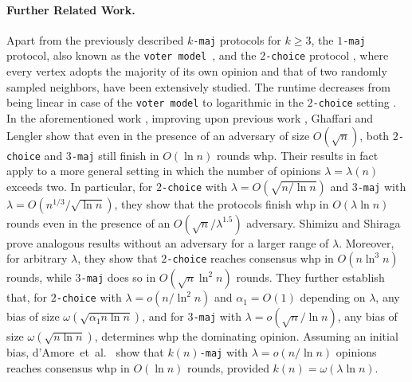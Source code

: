 \documentclass[11pt]{article}
\numberwithin{theorem}{section}
\begin{document}
\paragraph{Further Related Work.} Apart from the previously described \texttt{$k$-maj} protocols for $k\geq 3$, the \texttt{$1$-maj} protocol, also known as the \texttt{voter model}~\cite{cooperetal,HASSIN2001248,kanade,nakata}, and the \texttt{$2$-choice} protocol \cite{cooper_et_al:LIPIcs.DISC.2017.13,crucianietal,cruciani:hal-02002462,twochoicestabconsensus}, where every vertex adopts the majority of its own opinion and that of two randomly sampled neighbors, have been extensively studied.
The runtime decreases from being linear in case of the \texttt{voter model} \cite{berenbrink2016boundsvotermodeldynamic} to logarithmic in the \texttt{$2$-choice} setting \cite{GhaffariLengler}. 
In the aforementioned work \cite{GhaffariLengler}, improving upon previous work \cite{becchettilowerbound,hierarchyconj,ElsasserFKMT16,elsaesseretal}, Ghaffari and Lengler show that even in the presence of an adversary of size $O(\sqrt{n})$, both \texttt{$2$-choice} and \texttt{$3$-maj} still finish in $O(\ln n)$ rounds whp. Their results in fact apply to a more general setting in which the number of opinions $\lambda=\lambda(n)$ exceeds two. In particular,
for \texttt{$2$-choice} with $\lambda=O(\sqrt{n/\ln n})$ and \texttt{$3$-maj} with $\lambda =O(n^{1/3}/\sqrt{\ln n})$, they show that the protocols finish whp in $O(\lambda\ln n)$ rounds even in the presence of an $O(\sqrt{n}/\lambda^{1.5})$ adversary. 
Shimizu and Shiraga \cite{shimizu25} prove analogous results without an adversary for a larger range of $\lambda$. Moreover, for arbitrary $\lambda$, they show that \texttt{$2$-choice} reaches consensus whp in $O(n\ln^3 n)$ rounds, while \texttt{$3$-maj} does so in $O(\sqrt{n}\ln^2n)$ rounds. They further establish that, for \texttt{$2$-choice} with $\lambda=o(n/\ln^2n)$ and $\alpha_1=O(1)$ depending on $\lambda$, any bias of size $\omega(\sqrt{\alpha_1 n\ln n})$, and for \texttt{$3$-maj} with $\lambda=o(\sqrt{n}/\ln n)$, any bias of size $\omega(\sqrt{n\ln n})$,
determines whp the dominating opinion.
Assuming an initial bias, d'Amore~et~al.~\cite{damore_et_al:LIPIcs.DISC.2025.27} show that \texttt{$k(n)$-maj} with $\lambda=o(n/\ln n)$ opinions reaches consensus whp in $O(\ln n)$ rounds, provided $k(n)=\omega(\lambda\ln n)$.
\end{document}
